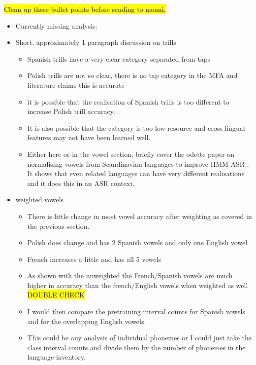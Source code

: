 \hl{Clean up these bullet points before sending to naomi.}

\begin{itemize}
    \item Currently missing analysis:
    \item Short, approximately 1 paragraph discussion on trills \cite{henriksen2023sociophonetic}
    \begin{itemize}
        \item Spanish trills have a very clear category separated from taps \cite{henriksen2023sociophonetic, taptrillcomparison}
        \item Polish trills are not so clear, there is no tap category in the MFA and literature claims this is accurate \cite{1995paperfrompolishtrillspaper}
        \item it is possible that the realisation of Spanish trills is too different to increase Polish trill accuracy.
        \item It is also possible that the category is too low-resource and cross-lingual features may not have been learned well.
        \item Either here or in the vowel section, briefly cover the odette paper on normalising vowels from Scandinavian languages to improve HMM ASR \cite{Stepanovic2025formant}. It shows that even related languages can have very different realisations and it does this in an ASR context.
    \end{itemize}
    \item weighted vowels
    \begin{itemize}
        \item There is little change in most vowel accuracy after weighting as covered in the previous section. 
        \item Polish does change and has 2 Spanish vowels and only one English vowel
        \item French increases a little and has all 5 vowels
        \item As shown with the unweighted the French/Spanish vowels are much higher in accuracy than the french/English vowels when weighted as well \hl{DOUBLE CHECK}
        \item I would then compare the pretraining interval counts for Spanish vowels and for the overlapping English vowels.
        \item This could be any analysis of individual phonemes or I could just take the class interval counts and divide them by the number of phonemes in the language inventory.

\end{itemize}
\end{itemize}
